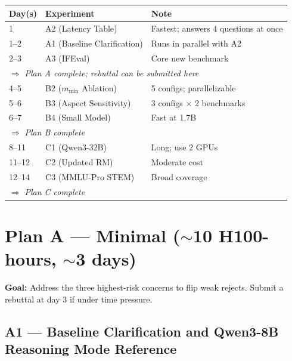 \documentclass[11pt,a4paper]{article}
\begin{document}
\begin{center}
\begin{tabular}{lll}
\toprule
\textbf{Day(s)} & \textbf{Experiment} & \textbf{Note} \\
\midrule
1     & A2 (Latency Table)            & Fastest; answers 4 questions at once \\
1--2  & A1 (Baseline Clarification)   & Runs in parallel with A2 \\
2--3  & A3 (IFEval)                   & Core new benchmark \\
\multicolumn{3}{l}{\quad $\Rightarrow$ \textit{Plan A complete; rebuttal can be submitted here}} \\
\midrule
4--5  & B2 ($m_{\min}$ Ablation)      & 5 configs; parallelizable \\
5--6  & B3 (Aspect Sensitivity)       & 3 configs $\times$ 2 benchmarks \\
6--7  & B4 (Small Model)              & Fast at 1.7B \\
\multicolumn{3}{l}{\quad $\Rightarrow$ \textit{Plan B complete}} \\
\midrule
8--11 & C1 (Qwen3-32B)                & Long; use 2 GPUs \\
11--12& C2 (Updated RM)               & Moderate cost \\
12--14& C3 (MMLU-Pro STEM)            & Broad coverage \\
\multicolumn{3}{l}{\quad $\Rightarrow$ \textit{Plan C complete}} \\
\bottomrule
\end{tabular}
\end{center}

\section{Plan A --- Minimal ($\sim$10 H100-hours, $\sim$3 days)}

\textbf{Goal:} Address the three highest-risk concerns to flip weak rejects. Submit a rebuttal
at day 3 if under time pressure.

\subsection*{A1 --- Baseline Clarification and Qwen3-8B Reasoning Mode Reference}
\end{document}
